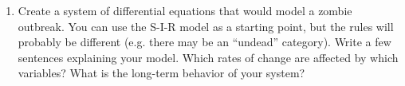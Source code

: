 \documentclass[12pt]{article}
\begin{document}
\begin{enumerate}
 \item Create a system of differential equations that would model a zombie outbreak. You can use the S-I-R model as a starting point, but the rules will probably be different (e.g. there may be an ``undead'' category). Write a few sentences explaining your model. Which rates of change are affected by which variables? What is the long-term behavior of your system?

\end{enumerate}
\end{document}
